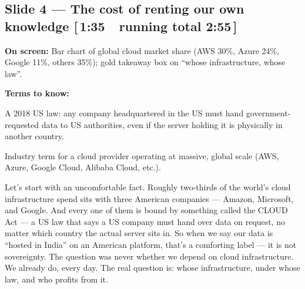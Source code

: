 \documentclass[11pt]{article}
\newcommand{\onscreen}[1]{\noindent\textbf{\color{sovGrey}On screen:} #1\par\vspace{4pt}}
\newcommand{\timing}[2]{\hfill{\normalsize\color{sovGrey}[\,#1\ \textbar\ running total #2\,]}}
\newenvironment{terms}
  {\noindent\textbf{\color{sovGrey}Terms to know:}
   \begin{description}[leftmargin=0pt,style=sameline,labelindent=0pt,itemsep=2pt,topsep=2pt,font=\normalfont\bfseries\color{sovDark}]}
  {\end{description}\vspace{2pt}}
\begin{document}
\subsection*{Slide 4 --- The cost of renting our own knowledge \timing{1:35}{2:55}}
\onscreen{Bar chart of global cloud market share (AWS 30\%, Azure 24\%, Google 11\%,
others 35\%); gold takeaway box on ``whose infrastructure, whose law''.}
\begin{terms}
  \item[CLOUD Act] A 2018 US law: any company headquartered in the US must hand
    government-requested data to US authorities, even if the server holding it is
    physically in another country.
  \item[Hyperscaler] Industry term for a cloud provider operating at massive, global
    scale (AWS, Azure, Google Cloud, Alibaba Cloud, etc.).
\end{terms}
\begin{sayit}
Let's start with an uncomfortable fact. Roughly two-thirds of the world's cloud
infrastructure spend sits with three American companies --- Amazon, Microsoft, and
Google. And every one of them is bound by something called the CLOUD Act --- a US law
that says a US company must hand over data on request, no matter which country the
actual server sits in. So when we say our data is ``hosted in India'' on an American
platform, that's a comforting label --- it is not sovereignty. The question was never
whether we depend on cloud infrastructure. We already do, every day. The real question
is: whose infrastructure, under whose law, and who profits from it.
\end{sayit}
\end{document}
